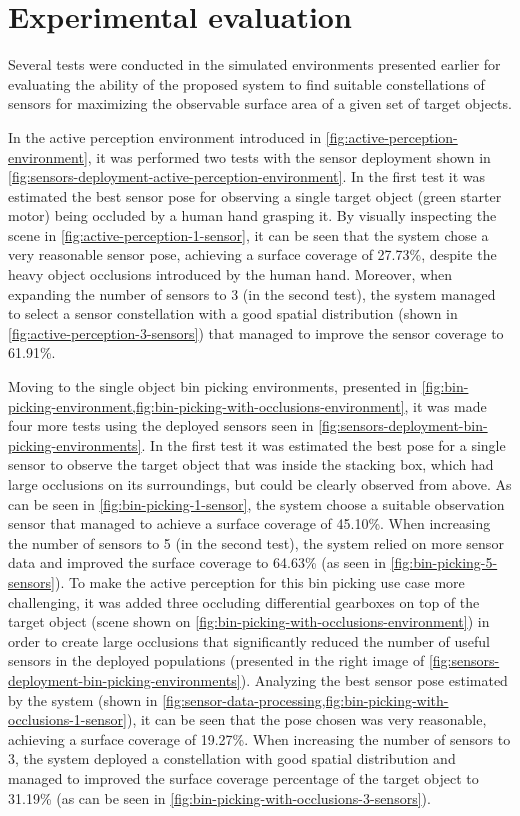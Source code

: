 \section{Experimental evaluation}\label{sec:results}

Several tests were conducted in the simulated environments presented earlier for evaluating the ability of the proposed system to find suitable constellations of sensors for maximizing the observable surface area of a given set of target objects.

In the active perception environment introduced in \cref{fig:active-perception-environment}, it was performed two tests with the sensor deployment shown in \cref{fig:sensors-deployment-active-perception-environment}. In the first test it was estimated the best sensor pose for observing a single target object (green starter motor) being occluded by a human hand grasping it. By visually inspecting the scene in \cref{fig:active-perception-1-sensor}, it can be seen that the system chose a very reasonable sensor pose, achieving a surface coverage of 27.73\%, despite the heavy object occlusions introduced by the human hand. Moreover, when expanding the number of sensors to 3 (in the second test), the system managed to select a sensor constellation with a good spatial distribution (shown in \cref{fig:active-perception-3-sensors}) that managed to improve the sensor coverage to 61.91\%.

Moving to the single object bin picking environments, presented in \cref{fig:bin-picking-environment,fig:bin-picking-with-occlusions-environment}, it was made four more tests using the deployed sensors seen in \cref{fig:sensors-deployment-bin-picking-environments}. In the first test it was estimated the best pose for a single sensor to observe the target object that was inside the stacking box, which had large occlusions on its surroundings, but could be clearly observed from above. As can be seen in \cref{fig:bin-picking-1-sensor}, the system choose a suitable observation sensor that managed to achieve a surface coverage of 45.10\%. When increasing the number of sensors to 5 (in the second test), the system relied on more sensor data and improved the surface coverage to 64.63\% (as seen in \cref{fig:bin-picking-5-sensors}). To make the active perception for this bin picking use case more challenging, it was added three occluding differential gearboxes on top of the target object (scene shown on \cref{fig:bin-picking-with-occlusions-environment}) in order to create large occlusions that significantly reduced the number of useful sensors in the deployed populations (presented in the right image of \cref{fig:sensors-deployment-bin-picking-environments}). Analyzing the best sensor pose estimated by the system (shown in \cref{fig:sensor-data-processing,fig:bin-picking-with-occlusions-1-sensor}), it can be seen that the pose chosen was very reasonable, achieving a surface coverage of 19.27\%. When increasing the number of sensors to 3, the system deployed a constellation with good spatial distribution and managed to improved the surface coverage percentage of the target object to 31.19\% (as can be seen in \cref{fig:bin-picking-with-occlusions-3-sensors}).

